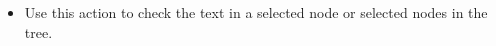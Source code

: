 
\begin{itemize}
\item Use this action to check the text in a selected node or selected nodes in the tree. 
\end{itemize}
